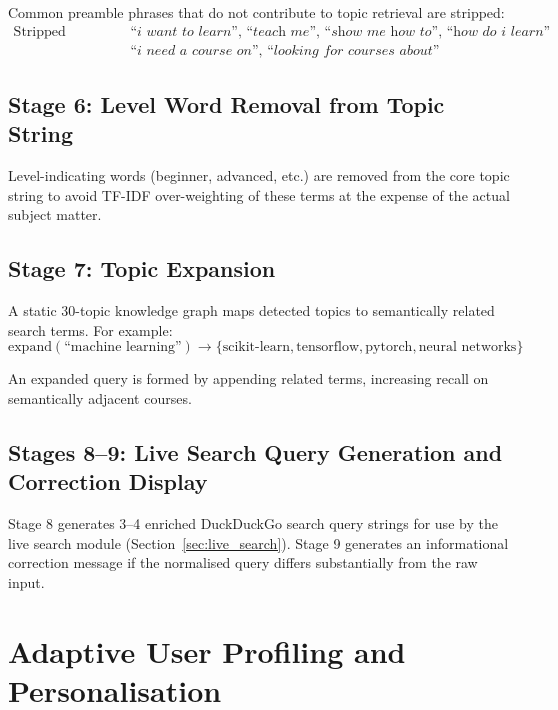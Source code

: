 \documentclass[12pt, a4paper]{article}
\begin{document}
Common preamble phrases that do not contribute to topic retrieval are stripped:
\begin{align*}
    \text{Stripped patterns: } &\textit{``i want to learn''}\text{, }\textit{``teach me''}\text{, }
    \textit{``show me how to''}\text{, }\textit{``how do i learn''}\\
    &\textit{``i need a course on''}\text{, }\textit{``looking for courses about''}
\end{align*}

\subsection{Stage 6: Level Word Removal from Topic String}

Level-indicating words (beginner, advanced, etc.) are removed from the core topic string to
avoid TF-IDF over-weighting of these terms at the expense of the actual subject matter.

\subsection{Stage 7: Topic Expansion}

A static 30-topic knowledge graph maps detected topics to semantically related search terms.
For example:
\begin{equation}
    \text{expand}(\text{``machine learning''}) \to 
    \{\text{scikit-learn}, \text{tensorflow}, \text{pytorch}, \text{neural networks}\}
    \label{eq:topicexpand}
\end{equation}

An expanded query is formed by appending related terms, increasing recall on semantically
adjacent courses.

\subsection{Stages 8–9: Live Search Query Generation and Correction Display}

Stage 8 generates 3–4 enriched DuckDuckGo search query strings for use by the live search
module (Section~\ref{sec:live_search}). Stage 9 generates an informational correction message
if the normalised query differs substantially from the raw input.

\section{Adaptive User Profiling and Personalisation}
\label{sec:personalization}
\end{document}
